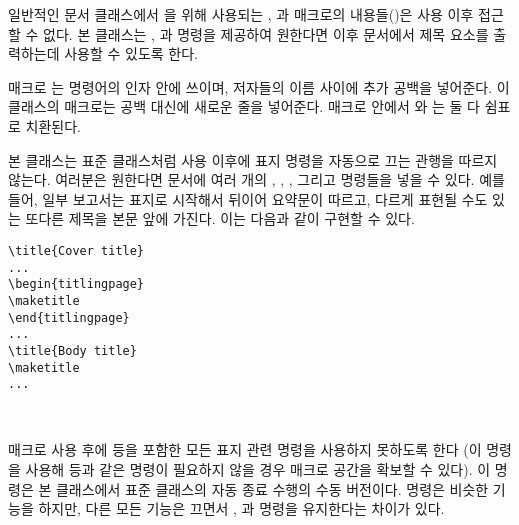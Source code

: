 \documentclass[10pt,a4paper]{oblivoir}
\begin{document}
일반적인 문서 클래스에서 \cmd{\maketitle}을 위해 사용되는 \cmd{\title},
\cmd{\author}과  매크로의 내용들()은 \cmd{\maketitle} 사용
이후 접근할 수 없다.
본 클래스는 \cmd{\thetitle}, \cmd{\theauthor}과 \cmd{\thedate} 명령을 제공하여
원한다면 이후 문서에서 제목 요소를 출력하는데 사용할 수 있도록 한다.

\begin{tcolorbox}
\cmd{\and} \cmd{\andnext}
\end{tcolorbox}
매크로 \cmd{\and}는 \cmd{\author} 명령어의 인자 안에 쓰이며, 저자들의 이름
사이에 추가 공백을 넣어준다.
이 클래스의 \cmd{\andnext} 매크로는 공백 대신에 새로운 줄을 넣어준다.
\cmd{\theauthor} 매크로 안에서 \cmd{\and}와 \cmd{\andnext}는 둘 다 쉼표로
치환된다.

본 클래스는 표준 클래스처럼 \cmd{\maketitle} 사용 이후에 표지 명령을 자동으로
끄는 관행을 따르지 않는다.
여러분은 원한다면 문서에 여러 개의 \cmd{\title}, \cmd{\author}, ,
그리고 \cmd{\maketitle} 명령들을 넣을 수 있다.
예를 들어, 일부 보고서는 표지로 시작해서 뒤이어 요약문이 따르고, 다르게 표현될
수도 있는 또다른 제목을 본문 앞에 가진다.
이는 다음과 같이 구현할 수 있다.
\begin{verbatim}
\title{Cover title}
...
\begin{titlingpage}
\maketitle
\end{titlingpage}
...
\title{Body title}
\maketitle
...
\end{verbatim}

\begin{tcolorbox}
\cmd{\killtitle} \cmd{\keepthetitle}\\
\cmd{\emptythanks}
\end{tcolorbox}
\cmd{\killtitle} 매크로 사용 후에 \cmd{\thetitle} 등을 포함한 모든 표지 관련
명령을 사용하지 못하도록  한다 (이 명령을 사용해 \cmd{\thetitle} 등과 같은
명령이 필요하지 않을 경우 매크로 공간을 확보할 수 있다).
이 명령은 본 클래스에서 표준 클래스의 자동 종료 수행의 수동 버전이다.
\cmd{\keepthetitle} 명령은 비슷한 기능을 하지만, 다른 모든 기능은 끄면서
\cmd{\thetitle}, \cmd{\theauthor}과 \cmd{\thedate} 명령을 유지한다는 차이가
있다.
\end{document}
